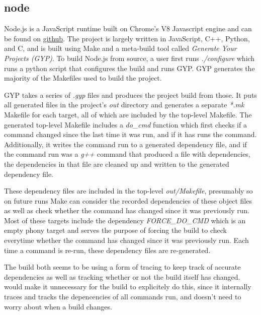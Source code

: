 
\subsection{node}
\label{sec:eval:node}

Node.js is a JavaScript runtime built on Chrome's V8 Javascript engine and can be found on \href{``https://github.com/nodejs/node''}{github}.  The project is largely written in JavaScript, C++, Python, and C, and is built using Make and a meta-build tool called \emph{Generate Your Projects (GYP)}.  To build Node.js from source, a user first runs \emph{./configure} which runs a python script that configures the build and runs GYP.  GYP generates the majority of the Makefiles used to build the project.

GYP takes a series of \emph{.gyp} files and produces the project build from those.  It puts all generated files in the project's \emph{out} directory and generates a separate \emph{*.mk} Makefile for each target, all of which are included by the top-level Makefile.  The generated top-level Makefile includes a \emph{do\_cmd} function which first checks if a command changed since the last time it was run, and if it has runs the command.  Additionally, it writes the command run to a generated dependency file, and if the command run was a \emph{g++} command that produced a file with dependencies, the dependencies in that file are cleaned up and written to the generated dependency file.

These dependency files are included in the top-level \emph{out/Makefile}, presumably so on future runs Make can consider the recorded dependencies of these object files as well as check whether the command has changed since it was previously run.  Most of these targets include the dependency \emph{FORCE\_DO\_CMD} which is an empty phony target and serves the purpose of forcing the build to check everytime whether the command has changed since it was previously run. Each time a command is re-run, these dependency files are re-generated.


The build both seems to be using a form of tracing to keep track of accurate dependencies as well as tracking whether or not the build itself has changed.  \Rattle would make it unnecessary for the build to explicitely do this, since it internally traces and tracks the depencencies of all commands run, and doesn't need to worry about when a build changes.

